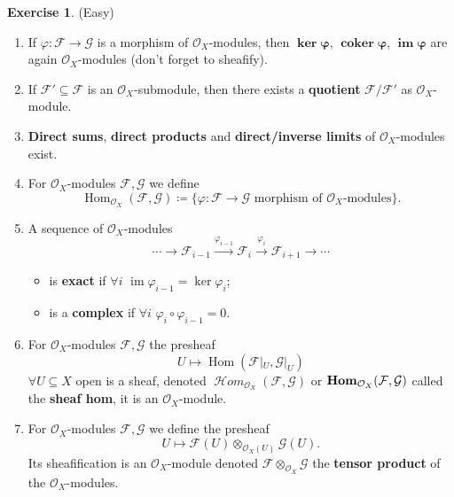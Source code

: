 \documentclass[12pt]{article}
\DeclareMathOperator{\im}{im}
\DeclareMathOperator{\coker}{coker}
\DeclareMathOperator{\Hom}{Hom}
\DeclareMathOperator{\shHom}{\mathcal{H}\textit{om}}
\DeclareMathOperator{\HOM}{\textnormal{\textbf{Hom}}}
\theoremstyle{definition}
\newtheorem*{exercise}{Exercise}
\theoremstyle{remark}
\begin{document}
\begin{exercise}
(Easy)
\begin{enumerate}[label=\arabic*)]
\item If $\varphi:\mathcal{F}\rightarrow\mathcal{G}$ is a morphism of $\mathcal{O}_X$-modules, then $\boldsymbol{\ker\varphi}$, $\boldsymbol{\coker\varphi}$, $\boldsymbol{\im\varphi}$ are again $\mathcal{O}_X$-modules (don't forget to sheafify).

\item If $\mathcal{F}'\subseteq\mathcal{F}$ is an $\mathcal{O}_X$-submodule, then there exists a \textbf{quotient} $\mathcal{F}/\mathcal{F}'$ as $\mathcal{O}_X$-module.

\item \textbf{Direct sums}, \textbf{direct products} and \textbf{direct/inverse limits} of $\mathcal{O}_X$-modules exist.

\item For $\mathcal{O}_X$-modules $\mathcal{F},\mathcal{G}$ we define
\[\Hom_{\mathcal{O}_X}(\mathcal{F},\mathcal{G})\coloneqq\{\varphi:\mathcal{F}\rightarrow\mathcal{G}\text{ morphism of }\mathcal{O}_X\text{-modules}\}.\]

\item A sequence of $\mathcal{O}_X$-modules
\[\cdots\longrightarrow\mathcal{F}_{i-1}\xrightarrow{\varphi_{i-1}}\mathcal{F}_i\overset{\varphi_i}{\longrightarrow}\mathcal{F}_{i+1}\longrightarrow\cdots\]
\begin{itemize}
\item is \textbf{exact} if $\forall i$ $\im\varphi_{i-1}=\ker\varphi_i$;
\item is a \textbf{complex} if $\forall i$ $\varphi_i\circ\varphi_{i-1}=0$.
\end{itemize}

\item For $\mathcal{O}_X$-modules $\mathcal{F},\mathcal{G}$ the presheaf
\[U\longmapsto\Hom(\mathcal{F}|_U,\mathcal{G}|_U)\]
$\forall U\subseteq X$ open is a sheaf, denoted $\shHom_{\mathcal{O}_X}(\mathcal{F},\mathcal{G})$ or $\HOM_{\mathcal{O}_X}(\mathcal{F},\mathcal{G})$ called the \textbf{sheaf hom}, it is an $\mathcal{O}_X$-module.

\item For $\mathcal{O}_X$-modules $\mathcal{F},\mathcal{G}$ we define the presheaf
\[U\longmapsto\mathcal{F}(U)\otimes_{\mathcal{O}_X(U)}\mathcal{G}(U).\]
Its sheafification is an $\mathcal{O}_X$-module denoted $\mathcal{F}\otimes_{\mathcal{O}_X}\mathcal{G}$ the \textbf{tensor product} of the $\mathcal{O}_X$-modules.
\end{enumerate}
\end{exercise}
\end{document}
